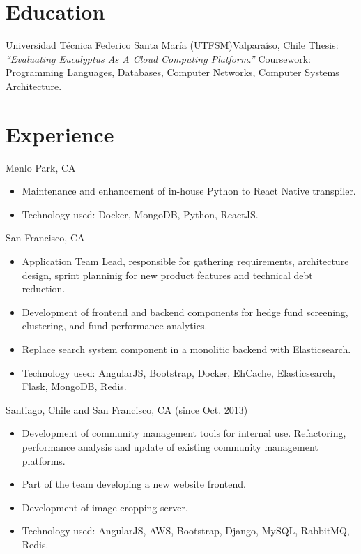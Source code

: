 \documentclass[sans,letter]{moderncv}
\begin{document}
\maketitle


\section{Education}

{Universidad Técnica Federico Santa María (UTFSM)}{Valparaíso, Chile}{
Thesis: \em ``Evaluating Eucalyptus As A Cloud Computing Platform.''
}{
Coursework: Programming Languages, Databases, Computer Networks, Computer Systems Architecture.
}


\section{Experience}

{Menlo Park, CA}{}
{\begin{itemize}
  \item Maintenance and enhancement of in-house Python to React Native transpiler.
  \item Technology used: Docker, MongoDB, Python, ReactJS.
\end{itemize}}

{San Francisco, CA}{}
{\begin{itemize}
  \item Application Team Lead, responsible for gathering requirements,
  architecture design, sprint planninig for new product features and
  technical debt reduction.
  \item Development of frontend and backend components for hedge fund
  screening, clustering, and fund performance analytics.
  \item Replace search system component in a monolitic backend with Elasticsearch.
  \item Technology used: AngularJS, Bootstrap, Docker, EhCache, Elasticsearch, Flask, MongoDB, Redis.
\end{itemize}}

{Santiago, Chile and San Francisco, CA (since Oct. 2013)}{}
{\begin{itemize}
  \item Development of community management tools for internal use.
  Refactoring, performance analysis and update of existing community
  management platforms.
  \item Part of the team developing a new website frontend.
  \item Development of image cropping server.
  \item Technology used: AngularJS, AWS, Bootstrap, Django, MySQL, RabbitMQ, Redis.
\end{itemize}}
\end{document}
